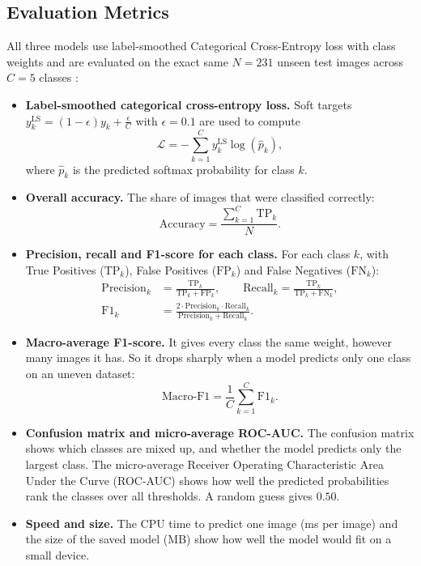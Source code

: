 \subsection{Evaluation Metrics}
All three models use label-smoothed Categorical Cross-Entropy loss with class weights and are evaluated on the exact same $N = 231$ unseen test images across $C = 5$ classes \cite{grandini2020metrics}:
\begin{itemize}
    \item \textbf{Label-smoothed categorical cross-entropy loss.} Soft targets $y^{\text{LS}}_k = (1 - \epsilon) y_k + \frac{\epsilon}{C}$ with $\epsilon = 0.1$ are used to compute
    \begin{equation}
    \mathcal{L} = -\sum_{k=1}^{C} y^{\text{LS}}_k \log(\hat{p}_k),
    \end{equation}
    where $\hat{p}_k$ is the predicted softmax probability for class $k$.
    \item \textbf{Overall accuracy.} The share of images that were classified correctly:
    \begin{equation}
    \text{Accuracy} = \frac{\sum_{k=1}^{C} \text{TP}_k}{N}.
    \end{equation}
    \item \textbf{Precision, recall and F1-score for each class.} For each class $k$, with True Positives ($\text{TP}_k$), False Positives ($\text{FP}_k$) and False Negatives ($\text{FN}_k$):
    \begin{equation}
    \begin{aligned}
    \text{Precision}_k &= \frac{\text{TP}_k}{\text{TP}_k + \text{FP}_k}, \qquad
    \text{Recall}_k = \frac{\text{TP}_k}{\text{TP}_k + \text{FN}_k}, \\
    \text{F1}_k &= \frac{2 \cdot \text{Precision}_k \cdot \text{Recall}_k}{\text{Precision}_k + \text{Recall}_k}.
    \end{aligned}
    \end{equation}
    \item \textbf{Macro-average F1-score.} It gives every class the same weight, however many images it has. So it drops sharply when a model predicts only one class on an uneven dataset:
    \begin{equation}
    \text{Macro-F1} = \frac{1}{C} \sum_{k=1}^{C} \text{F1}_k.
    \end{equation}
    \item \textbf{Confusion matrix and micro-average ROC-AUC.} The confusion matrix shows which classes are mixed up, and whether the model predicts only the largest class. The micro-average Receiver Operating Characteristic Area Under the Curve (ROC-AUC) shows how well the predicted probabilities rank the classes over all thresholds. A random guess gives $0.50$.
    \item \textbf{Speed and size.} The CPU time to predict one image (ms per image) and the size of the saved model (MB) show how well the model would fit on a small device.
\end{itemize}

